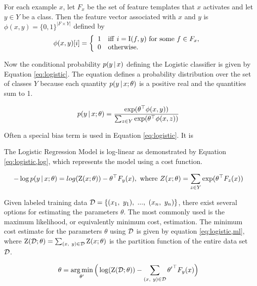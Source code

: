 For each example $x$, let $F_x$ be the set of feature templates that $x$ activates and let $y \in Y$ be a class. Then the feature vector associated with $x$ and $y$ is $\phi(x,y) = \{0, 1\}^{|F \times Y|}$ defined by
\[
  \phi(x,y)[i] = \left\{
  \begin{array}{ll}
  1 & {\rm iff\ } i = {\mathrm I}(f,y) {\rm\ for\ some\ }f \in F_x{\rm,} \\ 
  0 & {\rm otherwise.}  
  \end{array}
  \right.
\]


Now the conditional probability $p(y\mbox{$ \, | \, $} x)$ defining the Logistic
classifier is given by Equation \eqref{eq:logistic}. The equation
defines a probability distribution over the set of classes $Y$ because
each quantity $p(y\mbox{$ \, | \, $} x\mbox{$ ; \, $}\theta)$ is a positive real and the
quantities sum to 1. 

\begin{equation}
p(y\mbox{$ \, | \, $} x\mbox{$ ; \, $} \theta) = \frac{\exp(\theta^\top \phi(x,y))}{\sum_{z \in Y}\exp(\theta^\top \phi(x,z))}\label{eq:logistic}
\end{equation}

Often a special bias term is used in Equation \ref{eq:logistic}. It is 

The Logistic Regression Model is log-linear as demonstrated by
Equation \ref{eq:logistic,log}, which represents the model using a
cost function.

\begin{equation}
-\log p(y\mbox{$ \, | \, $} x\mbox{$ ; \, $} \theta) = log(\mbox{${\rm Z}$}(x;\theta)) - \theta^\top F_y(x),\ {\rm where}\ Z(x;\theta) = \sum_{z \in Y}\exp(\theta^\top F_{z}(x))\label{eq:logistic,log}
\end{equation}


Given labeled training data $\mbox{${\mathcal{D}}$} = \{(x_1,\ y_1),\ ...,\
(x_n,\ y_n)\}$, there exist several options for estimating the
parameters $\theta$. The most commonly used is the maximum likelihood,
or equivalently minimum cost, estimation. The minimum cost estimate
for the parameters $\theta$ using $\mbox{${\mathcal{D}}$}$ is given by equation
\eqref{eq:logistic,ml}, where $\mbox{${\rm Z}$}(\mathcal{D};\theta) = \sum_{(x,\ y) \in
  \mathcal{D}} \mbox{${\rm Z}$}(x;\theta)$ is the partition function of the entire
data set $\mbox{${\mathcal{D}}$}$.

\begin{equation}
\theta = \operatorname*{arg\,min}_{\theta'}\Big( \log(\mbox{${\rm Z}$}(\mathcal{D};\theta)) - \sum_{(x,\ y) \in \mathcal{D}} {\theta'}^\top F_y(x)\Big)\label{eq:logistic,ml}
\end{equation}

